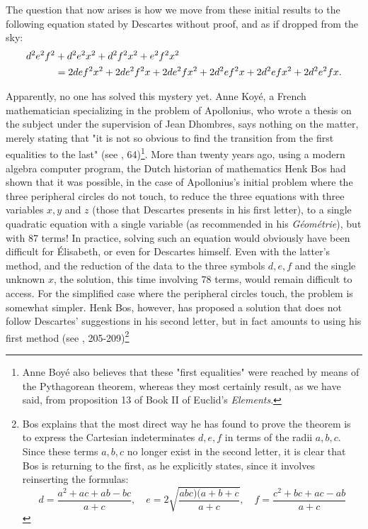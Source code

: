 \documentclass[12pt]{article}
\theoremstyle{définition}
\theoremstyle{remark}
\theoremstyle{plain}
\theoremstyle{plain}
\begin{document}
The question that now arises is how we move from these initial results to the following equation stated by Descartes without proof, and as if dropped from the sky:
\begin{align}
d^2e^2f^2 & + d^2e^2x^2 +d^2f^2x^2+e^2f^2x^2 \notag \\
& = 2def^2x^2+2de^2f^2x+ 2de^2fx^2 + 2d^2ef^2x+2d^2efx^2+2d^2e^2fx.
\end{align}

Apparently, no one has solved this mystery yet. Anne Koyé, a French mathematician specializing in the problem of Apollonius, who wrote a thesis on the subject under the supervision of Jean Dhombres, says nothing on the matter, merely stating that "it is not so obvious to find the transition from the first equalities to the last" (see \cite{Boy}, 64)\footnote{Anne Boyé also believes that these "first equalities" were reached by means of the Pythagorean theorem, whereas they most certainly result, as we have said, from proposition 13 of Book II of Euclid's {\it Elements}.}. More than twenty years ago, using a modern algebra computer program, the Dutch historian of mathematics Henk Bos had shown that it was possible, in the case of Apollonius's initial problem where the three peripheral circles do not touch, to reduce the three equations with three variables $x, y$ and $z$ (those that Descartes presents in his first letter), to a single quadratic equation with a single variable (as recommended in his {\it Géométrie}), but with 87 terms! In practice, solving such an equation would obviously have been difficult for \'{E}lisabeth, or even for Descartes himself. Even with the latter's method, and the reduction of the data to the three symbols $d, e, f$ and the single unknown $x$, the solution, this time involving 78 terms, would remain difficult to access. For the simplified case where the peripheral circles touch, the problem is somewhat simpler. Henk Bos, however, has proposed a solution that does not follow Descartes' suggestions in his second letter, but in fact amounts to using his first method (see \cite{Bos1}, 205-209)\footnote{Bos explains that the most direct way he has found to prove the theorem is to express the Cartesian indeterminates $d, e, f$ in terms of the radii $a, b, c$. Since these terms $a, b, c$ no longer exist in the second letter, it is clear that Bos is returning to the first, as he explicitly states, since it involves reinserting the formulas:
\[
d = \frac{a^2+ac+ab-bc}{a+c}, \quad e = 2\sqrt{\frac{abc)(a+b+c}{a+c}}, \quad f = \frac{c^2+bc+ac - ab}{a+c}
\]
}
\end{document}
